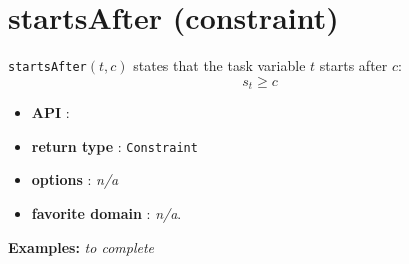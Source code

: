 \section{startsAfter (constraint)}\label{startsafter:startsafterconstraint}\hypertarget{startsafter:startsafterconstraint}{}
\begin{notedef}
  \texttt{startsAfter}$(t,c)$ states that the task variable $t$ starts after $c$:
  $$s_t \ge c$$
\end{notedef}

\begin{itemize}
	\item \textbf{API} :
	\item \textbf{return type} : \texttt{Constraint}
	\item \textbf{options} : \emph{n/a}
	\item \textbf{favorite domain} : \emph{n/a}.
\end{itemize}

\textbf{Examples:}
%
\emph{to complete}

